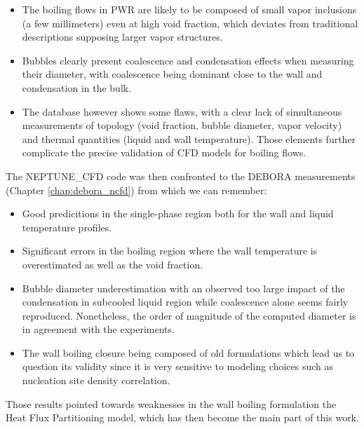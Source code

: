 \begin{itemize}
\item The boiling flows in PWR are likely to be composed of small vapor inclusions (a few millimeters) even at high void fraction, which deviates from traditional descriptions supposing larger vapor structures.
\item Bubbles clearly present coalescence and condensation effects when measuring their diameter, with coalescence being dominant close to the wall and condensation in the bulk.
\item The database however shows some flaws, with a clear lack of simultaneous measurements of topology (void fraction, bubble diameter, vapor velocity) and thermal quantities (liquid and wall temperature). Those elements further complicate the precise validation of CFD models for boiling flows. 
\end{itemize}

The NEPTUNE\_CFD code was then confronted to the DEBORA measurements (Chapter \ref{chap:debora_ncfd}) from which we can remember:

\begin{itemize}
\item Good predicitions in the single-phase region both for the wall and liquid temperature profiles.
\item Significant errors in the boiling region where the wall temperature is overestimated as well as the void fraction.
\item Bubble diameter underestimation with an observed too large impact of the condensation in subcooled liquid region while coalescence alone seems fairly reproduced. Nonetheless, the order of magnitude of the computed diameter is in agreement with the experiments.
\item The wall boiling closure being composed of old formulations which lead us to question its validity since it is very sensitive to modeling choices such as nucleation site density correlation. 
\end{itemize}

Those results pointed towards weaknesses in the wall boiling formulation \ie the Heat Flux Partitioning model, which has then become the main part of this work.

